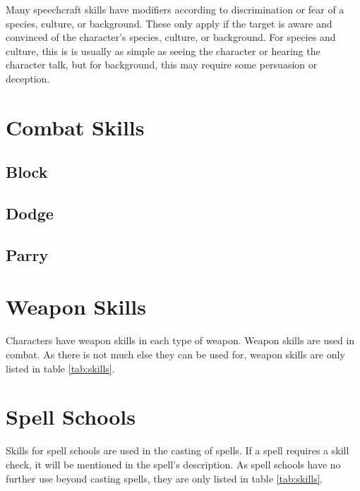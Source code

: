 \begin{multicols*}{2}
    Many speechcraft skills have modifiers according to discrimination or fear of
    a species, culture, or background. These only apply if the target is aware and
    convinced of the character's species, culture, or background. For species and
    culture, this is is usually as simple as seeing the character or hearing the
    character talk, but for background, this may require some persuasion or
    deception.

    \section{Combat Skills}

    \subsection{Block}\label{skill:block}

    \subsection{Dodge}\label{skill:dodge}

    \subsection{Parry}\label{skill:parry}

    \section{Weapon Skills}\label{weapon-skills}
    Characters have weapon skills in each type of weapon. Weapon skills are used in
    combat. As there is not much else they can be used for, weapon skills are only
    listed in table \ref{tab:skills}.


    \section{Spell Schools}\label{spell-schools}
    Skills for spell schools are used in the casting of spells. If a spell requires
    a skill check, it will be mentioned in the spell's description. As spell
    schools have no further use beyond casting spells, they are only listed in
    table \ref{tab:skills}.
\end{multicols*}

